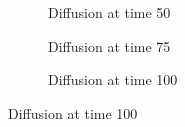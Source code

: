 \documentclass[paper=a4, fontsize=11pt]{scrartcl} %
\numberwithin{equation}{section} %
\numberwithin{figure}{section} %
\numberwithin{table}{section} %
\begin{document}
\begin{figure}[H]
\begin{subfigure}[b]{0.45\textwidth}
{		}
	\caption{Diffusion at time 50}
	\end{subfigure}
	\begin{subfigure}[b]{0.45\textwidth}
		\noindent{}
	\caption{Diffusion at time 75}
	\end{subfigure}
	\hspace{5mm}
	\begin{subfigure}[b]{0.45\textwidth}
		\noindent{}
	\caption{Diffusion at time 100}
	\end{subfigure}
\end{figure}
\end{document}
